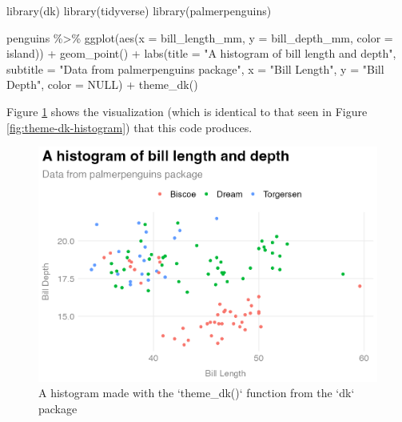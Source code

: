 \documentclass[
]{book}
\newenvironment{Shaded}{\begin{snugshade}}{\end{snugshade}}
\newcommand{\AttributeTok}[1]{\textcolor[rgb]{0.77,0.63,0.00}{#1}}
\newcommand{\ConstantTok}[1]{\textcolor[rgb]{0.00,0.00,0.00}{#1}}
\newcommand{\FunctionTok}[1]{\textcolor[rgb]{0.00,0.00,0.00}{#1}}
\newcommand{\NormalTok}[1]{#1}
\newcommand{\SpecialCharTok}[1]{\textcolor[rgb]{0.00,0.00,0.00}{#1}}
\newcommand{\StringTok}[1]{\textcolor[rgb]{0.31,0.60,0.02}{#1}}
\begin{document}
\begin{Shaded}
\begin{Highlighting}[]
\FunctionTok{library}\NormalTok{(dk)}
\FunctionTok{library}\NormalTok{(tidyverse)}
\FunctionTok{library}\NormalTok{(palmerpenguins)}

\NormalTok{penguins }\SpecialCharTok{\%\textgreater{}\%} 
  \FunctionTok{ggplot}\NormalTok{(}\FunctionTok{aes}\NormalTok{(}\AttributeTok{x =}\NormalTok{ bill\_length\_mm,}
             \AttributeTok{y =}\NormalTok{ bill\_depth\_mm,}
             \AttributeTok{color =}\NormalTok{ island)) }\SpecialCharTok{+}
  \FunctionTok{geom\_point}\NormalTok{() }\SpecialCharTok{+}
  \FunctionTok{labs}\NormalTok{(}\AttributeTok{title =} \StringTok{"A histogram of bill length and depth"}\NormalTok{,}
       \AttributeTok{subtitle =} \StringTok{"Data from palmerpenguins package"}\NormalTok{,}
       \AttributeTok{x =} \StringTok{"Bill Length"}\NormalTok{,}
       \AttributeTok{y =} \StringTok{"Bill Depth"}\NormalTok{,}
       \AttributeTok{color =} \ConstantTok{NULL}\NormalTok{) }\SpecialCharTok{+}
  \FunctionTok{theme\_dk}\NormalTok{()}
\end{Highlighting}
\end{Shaded}

Figure \ref{fig:theme-dk-histogram-package} shows the visualization (which is identical to that seen in Figure \ref{fig:theme-dk-histogram}) that this code produces.

\begin{figure}
\includegraphics[width=1\linewidth]{packages_files/figure-latex/theme-dk-histogram-package-1} \caption{A histogram made with the `theme_dk()` function from the `dk` package}\label{fig:theme-dk-histogram-package}
\end{figure}
\end{document}
